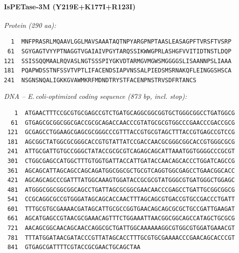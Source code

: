 \documentclass[11pt]{article}
\begin{document}
\paragraph{IsPETase-3M  (Y219E+K177I+R123I)}
\noindent\textit{Protein (290 aa):}
\begin{verbatim}
  1  MNFPRASRLMQAAVLGGLMAVSAAATAQTNPYARGPNPTAASLEASAGPFTVRSFTVSRP
 61  SGYGAGTVYYPTNAGGTVGAIAIVPGYTARQSSIKWWGPRLASHGFVVITIDTNSTLDQP
121  SSISSQQMAALRQVASLNGTSSSPIYGKVDTARMGVMGWSMGGGGSLISAANNPSLIAAA
181  PQAPWDSSTNFSSVTVPTLIFACENDSIAPVNSSALPIEDSMSRNAKQFLEINGGSHSCA
241  NSGNSNQALIGKKGVAWMKRFMDNDTRYSTFACENPNSTRVSDFRTANCS
\end{verbatim}
\medskip
\noindent\textit{DNA -- E.\,coli-optimized coding sequence (873 bp, incl. stop):}
\begin{verbatim}
   1  ATGAACTTTCCGCGTGCGAGCCGTCTGATGCAGGCGGCGGTGCTGGGCGGCCTGATGGCG
  61  GTGAGCGCGGCGGCGACCGCGCAGACCAACCCGTATGCGCGTGGCCCGAACCCGACCGCG
 121  GCGAGCCTGGAAGCGAGCGCGGGCCCGTTTACCGTGCGTAGCTTTACCGTGAGCCGTCCG
 181  AGCGGCTATGGCGCGGGCACCGTGTATTATCCGACCAACGCGGGCGGCACCGTGGGCGCG
 241  ATTGCGATTGTGCCGGGCTATACCGCGCGTCAGAGCAGCATTAAATGGTGGGGCCCGCGT
 301  CTGGCGAGCCATGGCTTTGTGGTGATTACCATTGATACCAACAGCACCCTGGATCAGCCG
 361  AGCAGCATTAGCAGCCAGCAGATGGCGGCGCTGCGTCAGGTGGCGAGCCTGAACGGCACC
 421  AGCAGCAGCCCGATTTATGGCAAAGTGGATACCGCGCGTATGGGCGTGATGGGCTGGAGC
 481  ATGGGCGGCGGCGGCAGCCTGATTAGCGCGGCGAACAACCCGAGCCTGATTGCGGCGGCG
 541  CCGCAGGCGCCGTGGGATAGCAGCACCAACTTTAGCAGCGTGACCGTGCCGACCCTGATT
 601  TTTGCGTGCGAAAACGATAGCATTGCGCCGGTGAACAGCAGCGCGCTGCCGATTGAAGAT
 661  AGCATGAGCCGTAACGCGAAACAGTTTCTGGAAATTAACGGCGGCAGCCATAGCTGCGCG
 721  AACAGCGGCAACAGCAACCAGGCGCTGATTGGCAAAAAAGGCGTGGCGTGGATGAAACGT
 781  TTTATGGATAACGATACCCGTTATAGCACCTTTGCGTGCGAAAACCCGAACAGCACCCGT
 841  GTGAGCGATTTTCGTACCGCGAACTGCAGCTAA
\end{verbatim}
\bigskip

\normalsize
\end{document}
